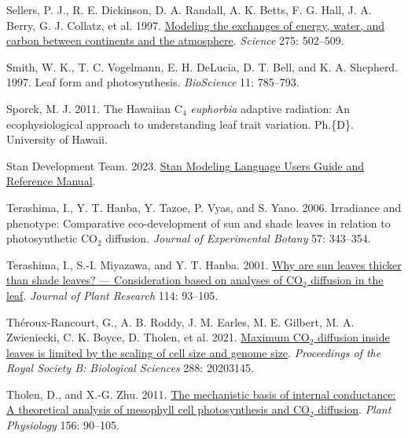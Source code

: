 \documentclass[
  letterpaper,
  DIV=11,
  numbers=noendperiod]{scrartcl}
\newlength{\cslhangindent}
\newlength{\cslentryspacingunit} %
\newenvironment{CSLReferences}[2] %
 {%
  \setlength{\parindent}{0pt}
  \ifodd #1
  \let\oldpar\par
  \def\par{\hangindent=\cslhangindent\oldpar}
  \fi
  \setlength{\parskip}{#2\cslentryspacingunit}
 }%
 {}
\begin{document}
\begin{CSLReferences}{1}{0}
\leavevmode{}%
Sellers, P. J., R. E. Dickinson, D. A. Randall, A. K. Betts, F. G. Hall,
J. A. Berry, G. J. Collatz, et al. 1997.
\href{https://doi.org/10.1126/science.275.5299.502}{Modeling the
exchanges of energy, water, and carbon between continents and the
atmosphere}. \emph{Science} 275: 502--509.

\leavevmode{}%
Smith, W. K., T. C. Vogelmann, E. H. DeLucia, D. T. Bell, and K. A.
Shepherd. 1997. Leaf form and photosynthesis. \emph{BioScience} 11:
785--793.

\leavevmode{}%
Sporck, M. J. 2011. The {Hawaiian} {C}\(_{\textrm{4}}\) \emph{euphorbia}
adaptive radiation: An ecophysiological approach to understanding leaf
trait variation. Ph.\{D\}. University of Hawaii.

\leavevmode{}%
Stan Development Team. 2023. \href{https://mc-stan.org}{Stan {Modeling}
{Language} {Users} {Guide} and {Reference} {Manual}}.

\leavevmode{}%
Terashima, I., Y. T. Hanba, Y. Tazoe, P. Vyas, and S. Yano. 2006.
Irradiance and phenotype: Comparative eco-development of sun and shade
leaves in relation to photosynthetic {CO}\(_{\textrm{2}}\) diffusion.
\emph{Journal of Experimental Botany} 57: 343--354.

\leavevmode{}%
Terashima, I., S.-I. Miyazawa, and Y. T. Hanba. 2001.
\href{https://doi.org/10.1007/PL00013972}{Why are sun leaves thicker
than shade leaves? --- {Consideration} based on analyses of
{CO}\(_{\textrm{2}}\) diffusion in the leaf}. \emph{Journal of Plant
Research} 114: 93--105.

\leavevmode{}%
Théroux-Rancourt, G., A. B. Roddy, J. M. Earles, M. E. Gilbert, M. A.
Zwieniecki, C. K. Boyce, D. Tholen, et al. 2021.
\href{https://doi.org/10.1098/rspb.2020.3145}{Maximum
{CO}\(_{\textrm{2}}\) diffusion inside leaves is limited by the scaling
of cell size and genome size}. \emph{Proceedings of the Royal Society B:
Biological Sciences} 288: 20203145.

\leavevmode{}%
Tholen, D., and X.-G. Zhu. 2011.
\href{https://doi.org/10.1104/pp.111.172346}{The mechanistic basis of
internal conductance: {A} theoretical analysis of mesophyll cell
photosynthesis and {CO}\(_{\textrm{2}}\) diffusion}. \emph{Plant
Physiology} 156: 90--105.


\end{CSLReferences}
\end{document}
